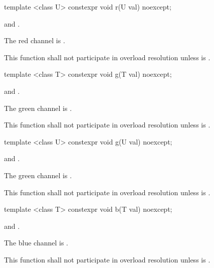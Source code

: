 %
\begin{itemdecl}
template <class U>
constexpr void r(U val) noexcept;
\end{itemdecl}
\begin{itemdescr}
\pnum
\requires
{} and .

\pnum
\effects
The red channel is .

\pnum
\remarks
This function shall not participate in overload resolution unless  is .
\end{itemdescr}

%
\begin{itemdecl}
template <class T>
constexpr void g(T val) noexcept;
\end{itemdecl}

\begin{itemdescr}
\pnum
\requires
{} and .

\pnum
\effects
The green channel is .

\pnum
\remarks
This function shall not participate in overload resolution unless  is .
\end{itemdescr}

%
\begin{itemdecl}
template <class U>
constexpr void g(U val) noexcept;
\end{itemdecl}
\begin{itemdescr}
\pnum
\requires
{} and .

\pnum
\effects
The green channel is .

\pnum
\remarks
This function shall not participate in overload resolution unless  is .
\end{itemdescr}

%
\begin{itemdecl}
template <class T>
constexpr void b(T val) noexcept;
\end{itemdecl}
\begin{itemdescr}
\pnum
\requires
{} and .

\pnum
\effects
The blue channel is .

\pnum
\remarks
This function shall not participate in overload resolution unless  is .
\end{itemdescr}

